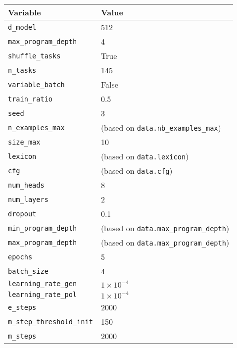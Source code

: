     \begin{table}[H]
        \centering
        \begin{tabular}{|l|l|}
        \hline
        \textbf{Variable} & \textbf{Value} \\
        \hline
        \texttt{d\_model} & 512 \\
        \hline
        \texttt{max\_program\_depth} & 4 \\
        \hline
        \texttt{shuffle\_tasks} & True \\
        \hline
        \texttt{n\_tasks} & 145 \\
        \hline
        \texttt{variable\_batch} & False \\
        \hline
        \texttt{train\_ratio} & 0.5 \\
        \hline
        \texttt{seed} & 3 \\
        \hline
        \texttt{n\_examples\_max} & (based on \texttt{data.nb\_examples\_max}) \\
        \hline
        \texttt{size\_max} & 10 \\
        \hline
        \texttt{lexicon} & (based on \texttt{data.lexicon}) \\
        \hline
        \texttt{cfg} & (based on \texttt{data.cfg}) \\
        \hline
        \texttt{num\_heads} & 8 \\
        \hline
        \texttt{num\_layers} & 2 \\
        \hline
        \texttt{dropout} & 0.1 \\
        \hline
        \texttt{min\_program\_depth} & (based on \texttt{data.max\_program\_depth}) \\
        \hline
        \texttt{max\_program\_depth} & (based on \texttt{data.max\_program\_depth}) \\
        \hline
        \texttt{epochs} & 5 \\
        \hline
        \texttt{batch\_size} & 4 \\
        \hline
        \texttt{learning\_rate\_gen} & $1 \times 10^{-4}$ \\
        \hline
        \texttt{learning\_rate\_pol} & $1 \times 10^{-4}$ \\
        \hline
        \texttt{e\_steps} & 2000 \\
        \hline
        \texttt{m\_step\_threshold\_init} & 150 \\
        \hline
        \texttt{m\_steps} & 2000 \\

\end{tabular}
\end{table}
